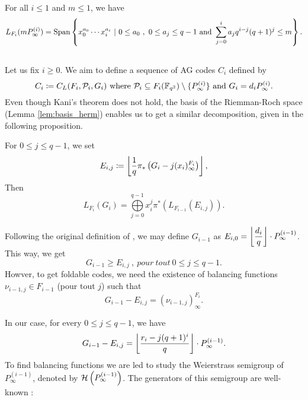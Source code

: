 \documentclass[10pt]{article}
\begin{document}
\begin{lemma}\label{lem:basis_herm}
For all $i \leq 1$ and $m \leq 1$, we have 
\[L_{F_i}(mP^{(i)}_{\infty}) = \operatorname{Span}\left\{x_0^{a_0} \cdots x_i^{a_i} \ | \ 0 \leq a_0 \ , \ 0 \leq a_j \leq q-1 \text{ and } \sum\limits_{j=0}^i a_jq^{i-j}(q+1)^j \leq m \right\}.\]
\end{lemma}

\subsection{}

Let us fix $i \geq 0$. We aim to define a sequence of AG codes $C_i$ defined by 
\[C_i \coloneqq C_L(F_i,\mathcal{P}_{i},G_i) \text{ where } \mathcal{P}_{i} \subseteq F_i(\mathbb{F}_{q^2}) \setminus \{P_\infty^{(i)}\} \text{ and } G_i = d_iP^{(i)}_{\infty}.\]
Even though Kani's theorem does not hold, the basis of the Riemman-Roch space (Lemma \ref{lem:basis_herm}) enables us to get a similar decomposition, given in the following proposition.

\begin{proposition} 
	For $0 \leq j \leq q-1$, we set
	\[E_{i,j} \coloneqq \left\lfloor \frac{1}{q} \pi_*\left(G_i-j(x_i)^{F_i}_{\infty}\right)\right\rfloor,\]
	  Then 
\[L_{F_i}(G_i) = \bigoplus\limits_{j=0}^{q-1} x_i^j \pi^*\left(L_{F_{i-1}}(E_{i,j})\right).\]
\end{proposition}

Following the original definition of \cite{BN20}, we may define $G_{i-1}$ as $E_{i,0} = \left\lfloor \dfrac{d_i}{q} \right\rfloor \cdot P^{(i-1)}_{\infty}$. This way, we get 
\[G_{i-1} \geq E_{i,j} \ , \ pour \ tout \ 0 \leq j \leq q-1.\] 
Howver, to get foldable codes, we need the existence of balancing functions  $\nu_{i-1,j} \in F_{i-1}$ (pour tout $j$) such that 
\begin{equation}\label{eq:balancing_fct_herm}
	G_{i-1}-E_{i,j} = (\nu_{i-1,j})^{F_i}_{\infty}.
\end{equation}


In our case, for every $0 \leq j \leq q-1$, we have
\[G_{i-1}-E_{i,j} = \left\lfloor \dfrac{r_i-j(q+1)^i}{q}\right\rfloor \cdot P^{(i-1)}_{\infty}.\]
To find balancing functions we are led to study the Weierstrass semigroup of $P^{(i-1)}_{\infty}$, denoted by $\mathcal{H}\left(P^{(i-1)}_{\infty}\right)$. The generators of this semigroup are well-known :
\end{document}
